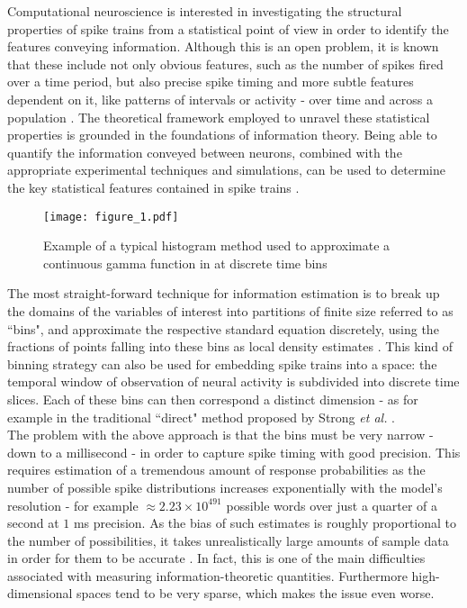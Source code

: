 \documentclass[12pt]{extarticle}
\begin{document}
\noindent
Computational neuroscience is interested in investigating the structural properties 
of spike trains from a statistical point of view in order to identify the features
conveying information. Although this is an open problem, it is known that these 
include not only obvious features, such as the number of spikes fired over a time
period, but also precise spike timing and more subtle features dependent on it, 
like patterns of intervals or activity - over time and across a population \cite{Victor.2002}. The theoretical framework employed to unravel these statistical
properties is grounded in the foundations of information theory.
Being able to quantify the information conveyed between neurons,
combined with the appropriate experimental techniques and simulations,
can be used to determine the key statistical features contained in
spike trains \cite{Victor.2002}.\\

\begin{figure}[h]
	\centering
	\texttt{[image: figure\_1.pdf]}
    \caption{Example of a typical histogram method used to approximate a continuous gamma function in at discrete time bins}
\end{figure}

\noindent
The most straight-forward technique for information estimation is to
break up the domains of the variables of interest into partitions of
finite size referred to as ``bins", and approximate the respective
standard equation discretely, using the fractions of points falling
into these bins as local density estimates \cite{Kraskov}. This kind of
binning strategy can also be used for embedding spike trains into a
space: the temporal window of observation of neural activity is
subdivided into discrete time slices. Each of these bins can then
correspond a distinct dimension - as for example in the traditional
``direct" method proposed by Strong \textit{et al.} \cite{STRONG}.\\

\noindent
The problem with the above approach is that the bins must be very
narrow - down to a millisecond \cite{Victor-Reich} - in order to capture spike
timing with good precision. This requires estimation of a tremendous
amount of response probabilities as the number of possible spike
distributions increases exponentially with the model's resolution -
for example
$\approx 2.23 \times 10^{491}$ possible words over just a quarter of a
second at $1$ ms precision. As the bias of such estimates is roughly
proportional to the number of possibilities, it takes unrealistically
large amounts of sample data in order for them to be accurate
\cite{Victor.2002}. In fact, this is one of the main difficulties associated
with measuring information-theoretic quantities. Furthermore
high-dimensional spaces tend to be very sparse, which makes the issue
even worse.\\
\end{document}
